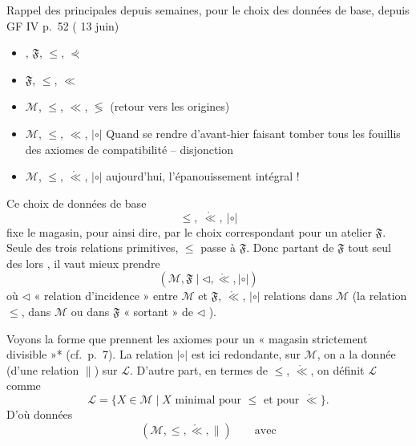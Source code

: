 \documentclass[11pt,a4paper]{article}
\begin{document}
Rappel des principales \struck{\ill{}}  
depuis  semaines, pour le choix des données de base,
depuis GF IV p.~52 (\struck{\ill{}} 13 juin)
\begin{itemize}
  \item[] \struck{\ill{}}, $\mathfrak{F}$, $\leq$, $\curlyeqprec$
  \item[] $\mathfrak{F}$, $\leq$, $\ll$
  \item[] $\mathcal{M}$, $\leq$, $\ll$, $\lessgtr$ (retour vers les origines)
  \item[] $\mathcal{M}$, $\leq$, $\ll$, $|\circ|$ \quad {}
    Quand se rendre  d'avant-hier faisant tomber tous les
    fouillis des axiomes de compatibilité -- disjonction
  \item[] $\mathcal{M}$, $\leq$, $\mathring{\ll}$, $|\circ|$ aujourd'hui,
    l'épanouissement intégral !
\end{itemize}

Ce choix  de données de base
\[
  \leq,\ \mathring{\ll},\ |\circ|
\]
fixe le magasin, pour ainsi dire, par le choix correspondant pour
 un atelier $\mathfrak{F}$. Seule des trois relations
primitives, $\leq$ passe à $\mathfrak{F}$. Donc partant de $\mathfrak{F}$ tout
seul des lors  , il vaut mieux
prendre 
\[
  (\mathcal{M}, \mathfrak{F} \mid \lhd, \mathring{\ll}, |\circ|)
\]
où $\lhd$ « relation d'incidence » entre $\mathcal{M}$ et $\mathfrak{F}$,
 $\mathring{\ll}$, $|\circ|$ relations dans $\mathcal{M}$ (la relation
$\leq$, dans $\mathcal{M}$ ou dans $\mathfrak{F}$ « sortant » de \struck{$\lhd$}
$\lhd$ ).

Voyons la forme que prennent les axiomes pour un « magasin strictement
divisible »* (cf.\ p.~7). La relation $|\circ|$ est ici redondante,
 sur $\mathcal{M}$, on a la donnée (d'une relation $\|$)
sur $\mathcal{L}$. D'autre part, en termes de \struck{\ill{}} $\leq$,
$\mathring{\ll}$, on définit $\mathcal{L}$ comme
\[
  \mathcal{L} = \{ X \in \mathcal{M} \mid X \text{ minimal pour } \leq
  \text{ et pour } \mathring{\ll} \} .
\]
D'où données
\[
  (\mathcal{M}, \leq, \mathring{\ll}, \|) \qquad \text{avec}
\]
\end{document}
